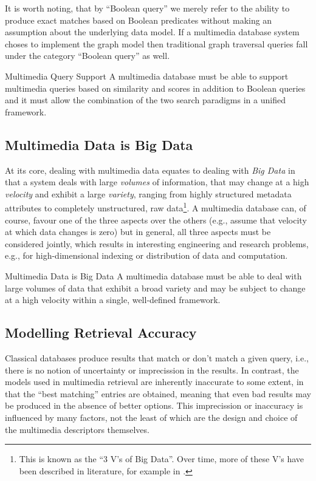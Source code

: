 It is worth noting, that by ``Boolean query'' we merely refer to the ability to produce exact matches based on Boolean predicates without making an assumption about the underlying data model. If a multimedia database system choses to implement the graph model then traditional graph traversal queries fall under the category ``Boolean query'' as well.

\begin{requirement}[label=requirement:multimedia_search]{Multimedia Query Support}{}
    A multimedia database must be able to support multimedia queries based on similarity and scores in addition to Boolean queries and it must allow the combination of the two search paradigms in a unified framework.
\end{requirement}

\subsection{Multimedia Data is Big Data}
At its core, dealing with multimedia data equates to dealing with \emph{Big Data} in that a system deals with large \emph{volumes} of information, that may change at a high \emph{velocity} and exhibit a large \emph{variety}, ranging from highly structured metadata attributes to completely unstructured, raw data\footnote{This is known as the ``3 V's of Big Data''. Over time, more of these V's have been described in literature, for example in \cite{Khan:2014Seven}.}. A multimedia database can, of course, favour one of the three aspects over the others (e.g., assume that velocity at which data changes is zero) but in general, all three aspects must be considered jointly, which results in interesting engineering and research problems, e.g., for high-dimensional indexing \cite{Hojsgaard:2019Index} or distribution of data and computation.

\begin{requirement}[label=requirement:big_data]{Multimedia Data is Big Data}{}
    A multimedia database must be able to deal with large volumes of data that exhibit a broad variety and may be subject to change at a high velocity within a single, well-defined framework.
\end{requirement}

\subsection{Modelling Retrieval Accuracy}

Classical databases produce results that match or don't match a given query, i.e., there is no notion of uncertainty or imprecission in the results. In contrast, the models used in multimedia retrieval are inherently inaccurate to some extent, in that the ``best matching'' entries are obtained, meaning that even bad results may be produced in the absence of better options. This imprecission or inaccuracy is influenced by many factors, not the least of which are the design and choice of the multimedia descriptors themselves.

